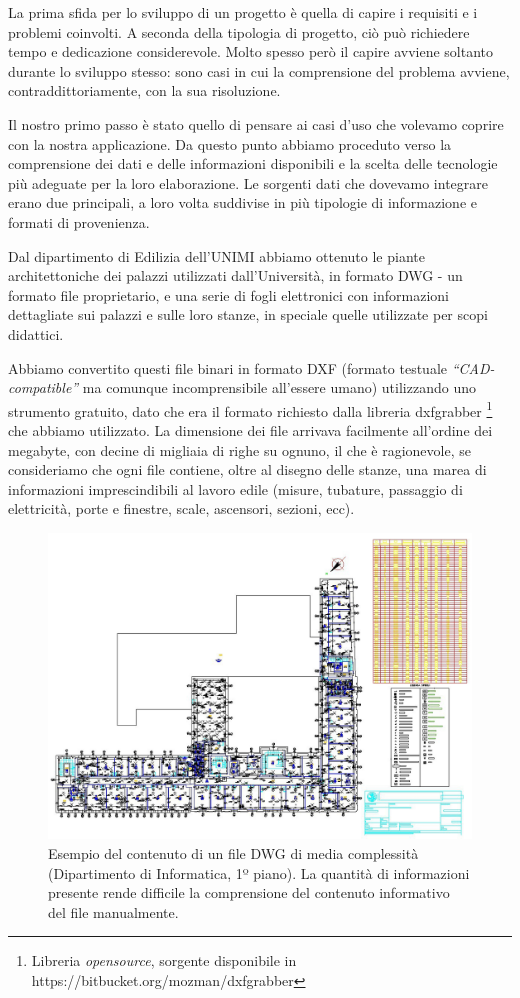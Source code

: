 \documentclass[12pt]{report}
\begin{document}
La prima sfida per lo sviluppo di un progetto è quella di capire i requisiti e i problemi coinvolti. A seconda della tipologia di progetto, ciò può richiedere tempo e dedicazione considerevole. Molto spesso però il capire avviene soltanto durante lo sviluppo stesso: sono casi in cui la comprensione del problema avviene, contraddittoriamente, con la sua risoluzione.

Il nostro primo passo è stato quello di pensare ai casi d'uso che volevamo coprire con la nostra applicazione. Da questo punto abbiamo proceduto verso la comprensione dei dati e delle informazioni disponibili e la scelta delle tecnologie più adeguate per la loro elaborazione. Le sorgenti dati che dovevamo integrare erano due principali, a loro volta suddivise in più tipologie di informazione e formati di provenienza.

Dal dipartimento di Edilizia dell'UNIMI abbiamo ottenuto le piante architettoniche dei palazzi utilizzati dall'Università, in formato DWG - un formato file proprietario, e una serie di fogli elettronici con informazioni dettagliate sui palazzi e sulle loro stanze, in speciale quelle utilizzate per scopi didattici.

Abbiamo convertito questi file binari in formato DXF (formato testuale \textit{``CAD-compatible''} ma comunque incomprensibile all'essere umano) utilizzando uno strumento gratuito, dato che era il formato richiesto dalla libreria dxfgrabber \footnote{Libreria \textit{opensource}, sorgente disponibile in https://bitbucket.org/mozman/dxfgrabber} che abbiamo utilizzato. La dimensione dei file arrivava facilmente all'ordine dei megabyte, con decine di migliaia di righe su ognuno, il che è ragionevole, se consideriamo che ogni file contiene, oltre al disegno delle stanze, una marea di informazioni imprescindibili al lavoro edile (misure, tubature, passaggio di elettricità, porte e finestre, scale, ascensori, sezioni, ecc).

\begin{figure}[h]
    \centering
    \includegraphics[width=\textwidth]{03-dxf-chaos.jpg}
    \caption{Esempio del contenuto di un file DWG di media complessità (Dipartimento di Informatica, 1º piano). La quantità di informazioni presente rende difficile la comprensione del contenuto informativo del file manualmente. }
    \label{fig:dxf_chaos}
\end{figure}
\end{document}
